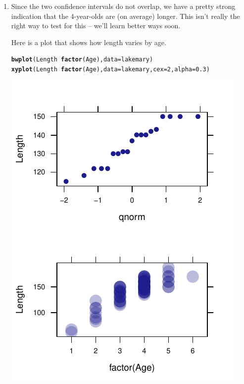 \documentclass[twoside]{book}\usepackage[]{graphicx}\usepackage[]{xcolor}
\makeatletter
\def\maxwidth{ %
  \ifdim\Gin@nat@width>\linewidth
    \linewidth
  \else
    \Gin@nat@width
  \fi
}
\newcommand{\hlnum}[1]{\textcolor[rgb]{0.686,0.059,0.569}{#1}}%
\newcommand{\hlopt}[1]{\textcolor[rgb]{0,0,0}{#1}}%
\newcommand{\hlstd}[1]{\textcolor[rgb]{0.345,0.345,0.345}{#1}}%
\newcommand{\hlkwc}[1]{\textcolor[rgb]{0.333,0.667,0.333}{#1}}%
\newcommand{\hlkwd}[1]{\textcolor[rgb]{0.737,0.353,0.396}{\textbf{#1}}}%
\newenvironment{kframe}{%
 \def\at@end@of@kframe{}%
 \ifinner\ifhmode%
  \def\at@end@of@kframe{\end{minipage}}%
  \begin{minipage}{\columnwidth}%
 \fi\fi%
 \def\FrameCommand##1{\hskip\@totalleftmargin \hskip-\fboxsep
 \colorbox{shadecolor}{##1}\hskip-\fboxsep
     \hskip-\linewidth \hskip-\@totalleftmargin \hskip\columnwidth}%
 \MakeFramed {\advance\hsize-\width
   \@totalleftmargin\z@ \linewidth\hsize
   \@setminipage}}%
 {\par\unskip\endMakeFramed%
 \at@end@of@kframe}
\newenvironment{knitrout}{}{} %
\makeatother
\begin{document}
\begin{solution}
\begin{enumerate}
\begin{knitrout}
{}



\end{knitrout}
	\item
		Since the two confidence intervals do not overlap, we have a pretty strong
		indication that the 4-year-olds are (on average) longer.  This isn't really
		the right way to test for this -- we'll learn better ways soon.

		Here is a plot that shows how length varies by age.
\begin{knitrout}
\color{fgcolor}\begin{kframe}
\begin{alltt}
\hlkwd{bwplot}\hlstd{(Length} \hlopt{~} \hlkwd{factor}\hlstd{(Age),} \hlkwc{data}\hlstd{=lakemary)}
\hlkwd{xyplot}\hlstd{(Length} \hlopt{~} \hlkwd{factor}\hlstd{(Age),} \hlkwc{data}\hlstd{=lakemary,} \hlkwc{cex}\hlstd{=}\hlnum{2}\hlstd{,} \hlkwc{alpha}\hlstd{=}\hlnum{0.3}\hlstd{)}
\end{alltt}
\end{kframe}

{\centering \includegraphics[width=\maxwidth]{figures/fig-unnamed-chunk-153-1} 
\includegraphics[width=\maxwidth]{figures/fig-unnamed-chunk-153-2} 

}



\end{knitrout}
\end{enumerate}
\end{solution}
\end{document}

